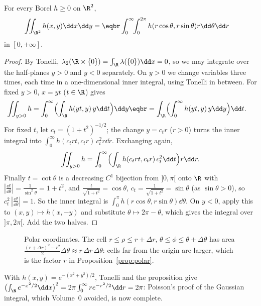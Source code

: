 \begin{proposition}\label{prop:polar}
For every Borel $h\ge0$ on $\R^2$,
\[
\begin{aligned}\iint_{\R^2}h(x,y)\dd x\dd y&=\eqbr\int_0^\infty\!\!\int_0^{2\pi}h(r\cos\theta,r\sin\theta)r\dd\theta\dd r\end{aligned}
\]
in $[0,+\infty]$.
\end{proposition}
\begin{proof}
By Tonelli, $\lambda_2(\R\times\{0\})=\int_\R\lambda(\{0\})\dd x=0$, so we may integrate over the half-planes $y>0$ and $y<0$ separately. On $y>0$ we change variables
three times, each time in a one-dimensional inner integral, using Tonelli in between. For fixed $y>0$, $x=yt$ ($t\in\R$) gives
\[
\begin{aligned}\iint_{y>0}h&=\int_0^\infty\Bigl(\int_\R h(yt,y)\,y\dd t\Bigr)\dd y\eqbr=\int_\R\Bigl(\int_0^\infty h(yt,y)\,y\dd y\Bigr)\dd t.\end{aligned}
\]
For fixed $t$, let $c_t=(1+t^2)^{-1/2}$; the change $y=c_tr$ ($r>0$) turns the inner integral into $\int_0^\infty h(c_trt,c_tr)\,c_t^2r\dd r$. Exchanging again,
\[
\iint_{y>0}h=\int_0^\infty\Bigl(\int_\R h(c_trt,c_tr)\,c_t^2\dd t\Bigr)r\dd r.
\]
Finally $t=\cot\theta$ is a decreasing $C^1$ bijection from $]0,\pi[$ onto $\R$ with $|\frac{\dd t}{\dd\theta}|=\frac1{\sin^2\theta}=1+t^2$, and $\frac t{\sqrt{1+t^2}}=\cos\theta$,
$c_t=\frac1{\sqrt{1+t^2}}=\sin\theta$ (as $\sin\theta>0$), so $c_t^2\,|\frac{\dd t}{\dd\theta}|=1$. So the inner integral is $\int_0^\pi h(r\cos\theta,r\sin\theta)\dd\theta$. On $y<0$, apply this to
$(x,y)\mapsto h(x,-y)$ and substitute $\theta\mapsto2\pi-\theta$, which gives the integral over $]\pi,2\pi[$. Add the two halves.
\end{proof}

\begin{figure}[ht]
\centering
{}
\caption{Polar coordinates. The cell $r\le\rho\le r+\Delta r$, $\theta\le\phi\le\theta+\Delta\theta$ has area $\frac{(r+\Delta r)^2-r^2}2\Delta\theta\approx r\,\Delta r\,\Delta\theta$: cells far
from the origin are larger, which is the factor $r$ in Proposition~\ref{prop:polar}.}
\label{fig:polar}
\end{figure}

With $h(x,y)=e^{-(x^2+y^2)/2}$, Tonelli and the proposition give $\bigl(\int_\R e^{-x^2/2}\dd x\bigr)^2=2\pi\int_0^\infty re^{-r^2/2}\dd r=2\pi$: Poisson's
proof of the Gaussian integral, which Volume~0 avoided, is now complete.

